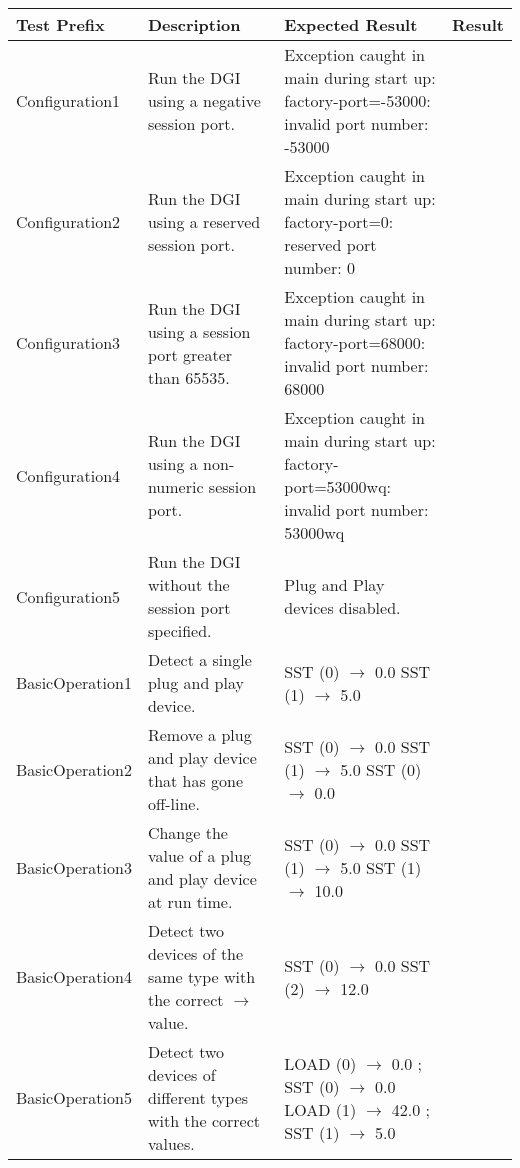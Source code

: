 \documentclass{article}
\begin{document}
%
\begin{center}
\begin{footnotesize}
\begin{longtable}{|p{3cm}|p{4cm}|p{10cm}|c|}
    \hline
    Test Prefix & Description & Expected Result & Result \\ \hline \endhead \hline \endfoot
    Configuration1 & Run the DGI using a negative session port. & Exception caught in main during start up: factory-port=-53000: invalid port number: -53000 & \\
    Configuration2 & Run the DGI using a reserved session port. & Exception caught in main during start up: factory-port=0: reserved port number: 0 & \\
    Configuration3 & Run the DGI using a session port greater than 65535. & Exception caught in main during start up: factory-port=68000: invalid port number: 68000 & \\
    Configuration4 & Run the DGI using a non-numeric session port. & Exception caught in main during start up: factory-port=53000wq: invalid port number: 53000wq & \\
    Configuration5 & Run the DGI without the session port specified. & Plug and Play devices disabled. & \\
    BasicOperation1 & Detect a single plug and play device. & SST (0) $\rightarrow$ 0.0 \newline SST (1) $\rightarrow$ 5.0 & \\
    BasicOperation2 & Remove a plug and play device that has gone off-line. & SST (0) $\rightarrow$ 0.0 \newline SST (1) $\rightarrow$ 5.0 \newline SST (0) $\rightarrow$ 0.0 & \\
    BasicOperation3 & Change the value of a plug and play device at run time. & SST (0) $\rightarrow$ 0.0 \newline SST (1) $\rightarrow$ 5.0 \newline SST (1) $\rightarrow$ 10.0 & \\
    BasicOperation4 & Detect two devices of the same type with the correct $\rightarrow$ value. & SST (0) $\rightarrow$ 0.0 \newline SST (2) $\rightarrow$ 12.0 & \\
    BasicOperation5 & Detect two devices of different types with the correct values. & LOAD (0) $\rightarrow$ 0.0 ; SST (0) $\rightarrow$ 0.0 \newline LOAD (1) $\rightarrow$ 42.0 ; SST (1) $\rightarrow$ 5.0 & \\

\end{longtable}
\end{footnotesize}
\end{center}
\end{document}
